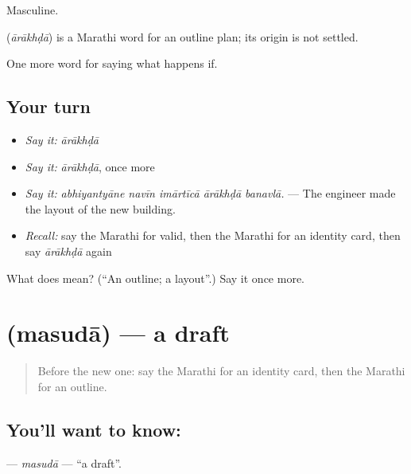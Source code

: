 Masculine.

\begin{cousinweb}
\textbf{} (\emph{ārākhḍā}) is a Marathi word for an outline plan; its origin is not settled.
\end{cousinweb}

\begin{grammarlens}[title={What you've built}]
One more word for saying what happens if.
\end{grammarlens}

\subsection*{Your turn}
\begin{itemize}
\raggedright
  \item \emph{Say it:} \emph{ārākhḍā}
  \item \emph{Say it:} \emph{ārākhḍā}, once more
  \item \emph{Say it:} \emph{abhiyantyāne navīn imārtīcā ārākhḍā banavlā.} — The engineer made the layout of the new building.
  \item \emph{Recall:} say the Marathi for valid, then the Marathi for an identity card, then say \emph{ārākhḍā} again
\end{itemize}

\begin{tcolorbox}[breakable,colback=teal!4,colframe=teal!35!black,title={Before you move on}]
What does  mean? (\textquotedblleft{}An outline; a layout\textquotedblright{}.) Say it once more.
\end{tcolorbox}
\section[\texorpdfstring{\mr{मसुदा} (masudā)}{मसुदा (masudā)}]{ (masudā) — a draft}

\label{lesson:MR-C544-masuda}



\begin{quote}
Before the new one: say the Marathi for an identity card, then the Marathi for an outline.
\end{quote}

\subsection*{You'll want to know: }
\textbf{} — \emph{masudā} — \textquotedblleft{}a draft\textquotedblright{}.

